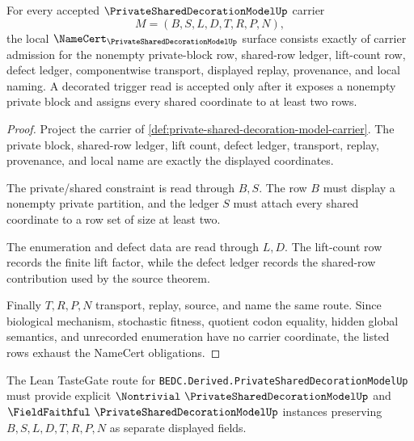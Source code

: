 \begin{theorem}
\label{thm:private-shared-decoration-model-namecert-obligations}
For every accepted $\PrivateSharedDecorationModelUp$ carrier
$$
M=(B,S,L,D,T,R,P,N),
$$
the local $\NameCert_{\PrivateSharedDecorationModelUp}$ surface consists exactly of carrier admission for the nonempty private-block row, shared-row ledger, lift-count row, defect ledger, componentwise transport, displayed replay, provenance, and local naming. A decorated trigger read is accepted only after it exposes a nonempty private block and assigns every shared coordinate to at least two rows.
\end{theorem}
\begin{proof}
Project the carrier of \autoref{def:private-shared-decoration-model-carrier}. The private block, shared-row ledger, lift count, defect ledger, transport, replay, provenance, and local name are exactly the displayed coordinates.

The private/shared constraint is read through $B,S$. The row $B$ must display a nonempty private partition, and the ledger $S$ must attach every shared coordinate to a row set of size at least two.

The enumeration and defect data are read through $L,D$. The lift-count row records the finite lift factor, while the defect ledger records the shared-row contribution used by the source theorem.

Finally $T,R,P,N$ transport, replay, source, and name the same route. Since biological mechanism, stochastic fitness, quotient codon equality, hidden global semantics, and unrecorded enumeration have no carrier coordinate, the listed rows exhaust the NameCert obligations.
\end{proof}



The Lean TasteGate route for \texttt{BEDC.Derived.PrivateSharedDecorationModelUp} must provide explicit $\Nontrivial\ \PrivateSharedDecorationModelUp$ and $\FieldFaithful\ \PrivateSharedDecorationModelUp$ instances preserving $B,S,L,D,T,R,P,N$ as separate displayed fields.

